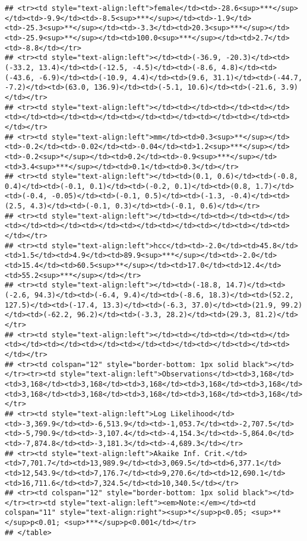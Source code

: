 \documentclass[]{article}
\begin{document}
\begin{verbatim}
## <tr><td style="text-align:left">female</td><td>-28.6<sup>***</sup></td><td>-9.9</td><td>-8.5<sup>***</sup></td><td>-1.9</td><td>-25.3<sup>**</sup></td><td>-3.3</td><td>20.3<sup>***</sup></td><td>-25.9<sup>**</sup></td><td>100.0<sup>***</sup></td><td>2.7</td><td>-8.8</td></tr>
## <tr><td style="text-align:left"></td><td>(-36.9, -20.3)</td><td>(-33.2, 13.4)</td><td>(-12.5, -4.5)</td><td>(-8.6, 4.8)</td><td>(-43.6, -6.9)</td><td>(-10.9, 4.4)</td><td>(9.6, 31.1)</td><td>(-44.7, -7.2)</td><td>(63.0, 136.9)</td><td>(-5.1, 10.6)</td><td>(-21.6, 3.9)</td></tr>
## <tr><td style="text-align:left"></td><td></td><td></td><td></td><td></td><td></td><td></td><td></td><td></td><td></td><td></td><td></td></tr>
## <tr><td style="text-align:left">mm</td><td>0.3<sup>**</sup></td><td>-0.2</td><td>-0.02</td><td>-0.04</td><td>1.2<sup>***</sup></td><td>-0.2<sup>*</sup></td><td>0.2</td><td>-0.9<sup>***</sup></td><td>3.4<sup>***</sup></td><td>0.1</td><td>0.3</td></tr>
## <tr><td style="text-align:left"></td><td>(0.1, 0.6)</td><td>(-0.8, 0.4)</td><td>(-0.1, 0.1)</td><td>(-0.2, 0.1)</td><td>(0.8, 1.7)</td><td>(-0.4, -0.05)</td><td>(-0.1, 0.5)</td><td>(-1.3, -0.4)</td><td>(2.5, 4.3)</td><td>(-0.1, 0.3)</td><td>(-0.1, 0.6)</td></tr>
## <tr><td style="text-align:left"></td><td></td><td></td><td></td><td></td><td></td><td></td><td></td><td></td><td></td><td></td><td></td></tr>
## <tr><td style="text-align:left">hcc</td><td>-2.0</td><td>45.8</td><td>1.5</td><td>4.9</td><td>89.9<sup>***</sup></td><td>-2.0</td><td>15.4</td><td>60.5<sup>**</sup></td><td>17.0</td><td>12.4</td><td>55.2<sup>***</sup></td></tr>
## <tr><td style="text-align:left"></td><td>(-18.8, 14.7)</td><td>(-2.6, 94.3)</td><td>(-6.4, 9.4)</td><td>(-8.6, 18.3)</td><td>(52.2, 127.5)</td><td>(-17.4, 13.3)</td><td>(-6.3, 37.0)</td><td>(21.9, 99.2)</td><td>(-62.2, 96.2)</td><td>(-3.3, 28.2)</td><td>(29.3, 81.2)</td></tr>
## <tr><td style="text-align:left"></td><td></td><td></td><td></td><td></td><td></td><td></td><td></td><td></td><td></td><td></td><td></td></tr>
## <tr><td colspan="12" style="border-bottom: 1px solid black"></td></tr><tr><td style="text-align:left">Observations</td><td>3,168</td><td>3,168</td><td>3,168</td><td>3,168</td><td>3,168</td><td>3,168</td><td>3,168</td><td>3,168</td><td>3,168</td><td>3,168</td><td>3,168</td></tr>
## <tr><td style="text-align:left">Log Likelihood</td><td>-3,369.9</td><td>-6,513.9</td><td>-1,053.7</td><td>-2,707.5</td><td>-5,790.9</td><td>-3,107.4</td><td>-4,154.3</td><td>-5,864.0</td><td>-7,874.8</td><td>-3,181.3</td><td>-4,689.3</td></tr>
## <tr><td style="text-align:left">Akaike Inf. Crit.</td><td>7,701.7</td><td>13,989.9</td><td>3,069.5</td><td>6,377.1</td><td>12,543.9</td><td>7,176.7</td><td>9,270.6</td><td>12,690.1</td><td>16,711.6</td><td>7,324.5</td><td>10,340.5</td></tr>
## <tr><td colspan="12" style="border-bottom: 1px solid black"></td></tr><tr><td style="text-align:left"><em>Note:</em></td><td colspan="11" style="text-align:right"><sup>*</sup>p<0.05; <sup>**</sup>p<0.01; <sup>***</sup>p<0.001</td></tr>
## </table>
\end{verbatim}
\end{document}
